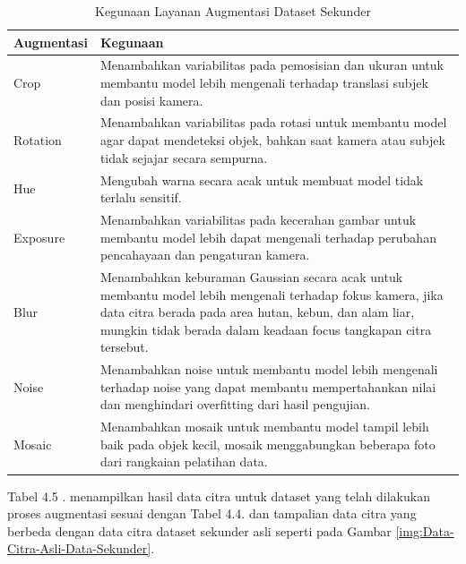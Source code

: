 \begin{singlespace}
	\begin{table}[H]
		\centering
		\caption{Kegunaan Layanan Augmentasi Dataset Sekunder}
		\label{tbl:Kegunaan-Layanan-Augmentasi-Dataset-Sekunder}
		\begin{tabular}{|p{3cm}|p{8cm}|}
			\hline
			\rowcolor[HTML]{D9D9D9} 
			Augmentasi & Kegunaan                                                                                                                                             \\ \hline
			Crop       & Menambahkan variabilitas pada pemosisian dan ukuran untuk membantu model lebih mengenali terhadap translasi subjek dan posisi kamera.                \\ \hline
			Rotation   & Menambahkan variabilitas pada rotasi untuk membantu model agar dapat mendeteksi objek, bahkan saat kamera atau subjek tidak sejajar secara sempurna. \\ \hline
			Hue        & Mengubah warna secara acak untuk membuat model tidak terlalu sensitif.                                                                       \\ \hline
			Exposure & Menambahkan variabilitas pada kecerahan gambar untuk membantu model lebih dapat mengenali terhadap perubahan pencahayaan dan pengaturan kamera. \\ \hline
			Blur & Menambahkan keburaman Gaussian secara acak untuk membantu model lebih mengenali terhadap fokus kamera, jika data citra berada pada area hutan, kebun, dan alam liar, mungkin tidak berada dalam keadaan focus tangkapan citra tersebut. \\ \hline
			Noise & Menambahkan noise untuk membantu model lebih mengenali terhadap noise yang dapat membantu mempertahankan nilai dan menghindari overfitting dari hasil pengujian. \\ \hline
			Mosaic & Menambahkan mosaik untuk membantu model tampil lebih baik pada objek kecil, mosaik menggabungkan beberapa foto dari rangkaian pelatihan data. \\ \hline
		\end{tabular}
	\end{table}
\end{singlespace}

Tabel 4.5 . menampilkan hasil data citra untuk dataset yang telah dilakukan proses augmentasi sesuai dengan Tabel 4.4. dan tampalian data citra yang berbeda dengan data citra dataset sekunder asli seperti pada Gambar \ref{img:Data-Citra-Asli-Data-Sekunder}.

